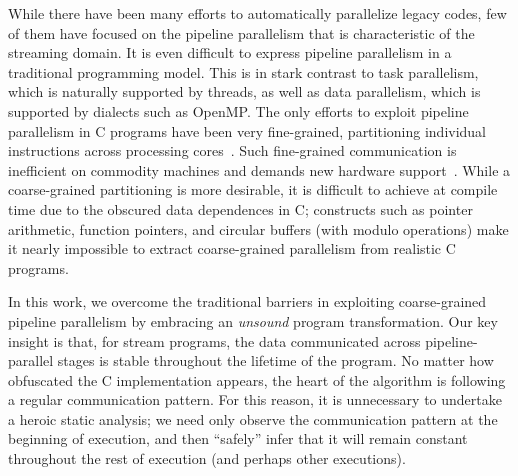 While there have been many efforts to automatically parallelize legacy
codes, few of them have focused on the pipeline parallelism that is
characteristic of the streaming domain.  It is even difficult to
express pipeline parallelism in a traditional programming model.  This
is in stark contrast to task parallelism, which is naturally supported
by threads, as well as data parallelism, which is supported by
dialects such as OpenMP.  The only efforts to exploit pipeline
parallelism in C programs have been very fine-grained, partitioning
individual instructions across processing
cores~\cite{ottoni05decoupled}.  Such fine-grained communication is
inefficient on commodity machines and demands new hardware
support~\cite{ottoni05decoupled,rangan04array}.  While a
coarse-grained partitioning is more desirable, it is difficult to
achieve at compile time due to the obscured data dependences in C;
constructs such as pointer arithmetic, function pointers, and circular
buffers (with modulo operations) make it nearly impossible to extract
coarse-grained parallelism from realistic C programs.



In this work, we overcome the traditional barriers in exploiting
coarse-grained pipeline parallelism by embracing an {\it unsound}
program transformation.  Our key insight is that, for stream programs,
the data communicated across pipeline-parallel stages is stable
throughout the lifetime of the program.  No matter how obfuscated the
C implementation appears, the heart of the algorithm is following a
regular communication pattern.  For this reason, it is unnecessary to
undertake a heroic static analysis; we need only observe the
communication pattern at the beginning of execution, and then
``safely'' infer that it will remain constant throughout the rest of
execution (and perhaps other executions).


